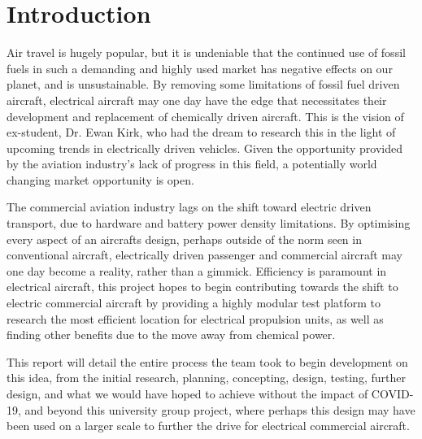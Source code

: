 \documentclass[../../main.tex]{subfiles}
\begin{document}
\chapter{Introduction} \label{introduction}

Air travel is hugely popular, but it is undeniable that the continued use of fossil fuels in such a demanding and highly used market has negative effects on our planet, and is unsustainable.
By removing some limitations of fossil fuel driven aircraft, electrical aircraft may one day have the edge that necessitates their development and replacement of chemically driven aircraft.
This is the vision of ex-student, Dr. Ewan Kirk, who had the dream to research this in the light of upcoming trends in electrically driven vehicles.
Given the opportunity provided by the aviation industry’s lack of progress in this field, a potentially world changing market opportunity is open. 

The commercial aviation industry lags on the shift toward electric driven transport, due to hardware and battery power density limitations.
By optimising every aspect of an aircrafts design, perhaps outside of the norm seen in conventional aircraft, electrically driven passenger and commercial aircraft may one day become a reality, rather than a gimmick.
Efficiency is paramount in electrical aircraft, this project hopes to begin contributing towards the shift to electric commercial aircraft by providing a highly modular test platform to research the most efficient location for electrical propulsion units, as well as finding other benefits due to the move away from chemical power. 

This report will detail the entire process the team took to begin development on this idea, from the initial research, planning, concepting, design, testing, further design, and what we would have hoped to achieve without the impact of COVID-19, and beyond this university group project, where perhaps this design may have been used on a larger scale to further the drive for electrical commercial aircraft. 
\end{document}
